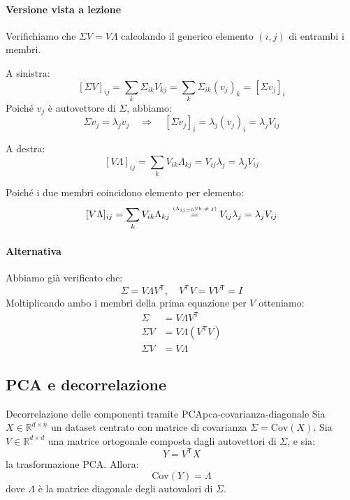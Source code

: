 \begin{dimostrazione}{}{}
    \paragraph{Versione vista a lezione} Verifichiamo che \( \Sigma V = V \Lambda \) calcolando il generico elemento \( (i, j) \) di entrambi i membri.

A sinistra:
\[
[\Sigma V]_{ij} = \sum_k \Sigma_{ik} V_{kj}
= \sum_k \Sigma_{ik} (v_j)_k = [\Sigma v_j]_i
\]
Poiché \( v_j \) è autovettore di \( \Sigma \), abbiamo:
\[
\Sigma v_j = \lambda_j v_j \quad \Rightarrow \quad [\Sigma v_j]_i = \lambda_j (v_j)_i = \lambda_j V_{ij}
\]

A destra:
\[
[V \Lambda]_{ij} = \sum_k V_{ik} \Lambda_{kj} = V_{ij} \lambda_j = \lambda_j V_{ij}
\]

Poiché i due membri coincidono elemento per elemento:
\[
    [V \Lambda]_{ij} = \sum_k V_{ik} \Lambda_{kj} \stackrel{\text{\tiny (\(\Lambda_{ij = 0} \forall k \neq j\))}}{=} V_{ij} \lambda_j = \lambda_j V_{ij}
\]

\paragraph{Alternativa}

Abbiamo già verificato che:
\[
\Sigma = V \Lambda V^\mathsf{T} ,\quad V^\mathsf{T}V = VV^\mathsf{T} = I
\]
Moltiplicando ambo i membri della prima equazione per $V$ otteniamo:
\begin{align*}
    \Sigma &= V \Lambda V^\mathsf{T} \\
    \Sigma V &= V \Lambda (V^\mathsf{T} V) \\
    \Sigma V &= V \Lambda
\end{align*}

\end{dimostrazione}

\subsection{PCA e decorrelazione}

\begin{proposizione}{Decorrelazione delle componenti tramite PCA}{pca-covarianza-diagonale}
Sia \( X \in \mathbb{R}^{d \times n} \) un dataset centrato con matrice di covarianza \( \Sigma = \mathrm{Cov}(X) \). Sia \( V \in \mathbb{R}^{d \times d} \) una matrice ortogonale composta dagli autovettori di \( \Sigma \), e sia:
\[
Y = V^\mathsf{T} X
\]
la trasformazione PCA. Allora:
\[
\mathrm{Cov}(Y) = \Lambda
\]
dove \( \Lambda \) è la matrice diagonale degli autovalori di \( \Sigma \).
\end{proposizione}

